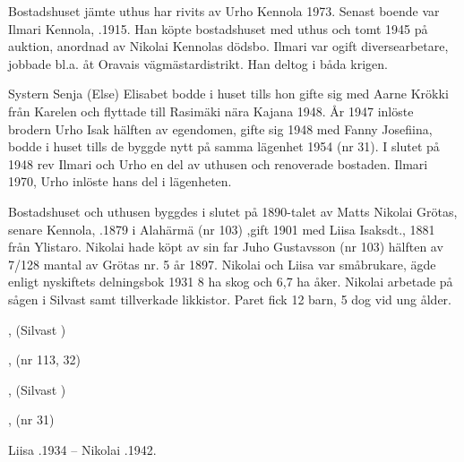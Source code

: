 
Bostadshuset jämte uthus har rivits av Urho Kennola 1973. Senast boende var Ilmari Kennola, .1915. Han köpte bostadshuset med uthus och tomt 1945 på auktion, anordnad av Nikolai Kennolas dödsbo. Ilmari var ogift diversearbetare, jobbade bl.a. åt Oravais vägmästardistrikt. Han deltog i båda krigen.

Systern Senja (Else) Elisabet bodde i huset tills hon gifte sig med Aarne Krökki från Karelen och flyttade till Rasimäki nära Kajana 1948. År 1947 inlöste brodern Urho Isak hälften av egendomen, gifte sig 1948 med Fanny Josefiina, bodde i  huset tills de byggde nytt på samma lägenhet 1954 (nr 31). I slutet på 1948 rev Ilmari och Urho en del av uthusen och  renoverade bostaden.
Ilmari  1970, Urho inlöste hans del i lägenheten.


Bostadshuset och uthusen byggdes i slutet på 1890-talet av Matts Nikolai Grötas, senare Kennola, .1879 i Alahärmä (nr 103) ,gift 1901 med Liisa Isaksdt.,  1881 från Ylistaro. Nikolai hade köpt av sin far Juho Gustavsson (nr 103) hälften av 7/128 mantal av Grötas nr. 5 år 1897. Nikolai och Liisa var småbrukare, ägde enligt nyskiftets delningsbok 1931 8 ha skog och 6,7 ha åker. Nikolai arbetade på sågen i Silvast samt tillverkade likkistor. Paret fick 12 barn, 5 dog vid ung ålder.
\begin{jhchildren}
  \item {}
  \item {}
  \item {}
  \item {}
  \item {}, (Silvast    )
  \item {}, (nr 113, 32)
  \item {}
  \item {}, (Silvast   )
  \item {}
  \item {}
  \item {}, (nr 31)
  \item {}
\end{jhchildren}
Liisa .1934  --  Nikolai .1942.



